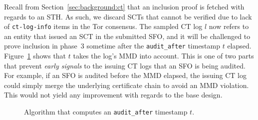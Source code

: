 Recall from Section~\ref{sec:background:ct} that an inclusion proof is fetched
with regards to an STH.  As such, we discard SCTs that cannot be verified due to
lack of \texttt{ct-log-info} items in the Tor consensus.  The sampled CT log $l$
now refers to an entity that issued an SCT in the submitted SFO, and it will be
challenged to prove inclusion in phase~3 sometime after the
\texttt{audit\_after} timestamp $t$ elapsed.  Figure~\ref{fig:audit-after} shows
that $t$ takes the log's MMD into account.  This is one of two parts that
prevent \emph{early signals} to the issuing CT logs that an SFO is being
audited.  For example, if an SFO is audited before the MMD elapsed, the issuing
CT log could simply merge the underlying certificate chain to avoid an MMD
violation.  This would not yield any improvement with regards to the base
design.

\begin{figure}
	\centering
	\caption{%
		Algorithm that computes an \texttt{audit\_after} timestamp $t$.
	}
	\label{fig:audit-after}
\end{figure}

